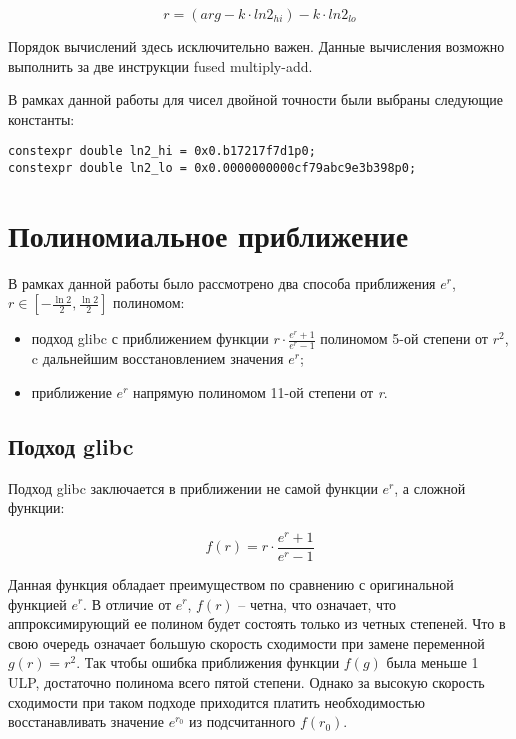\begin{equation}
    r = (arg - k \cdot ln{2}_{hi}) - k \cdot ln{2}_{lo}
\end{equation}

Порядок вычислений здесь исключительно важен.
Данные вычисления возможно выполнить за две инструкции \foreignlanguage{english}{fused multiply-add}.

В рамках данной работы для чисел двойной точности были выбраны следующие константы:

\begin{lstlisting}[caption={Константы $\ln{2}_{hi}$ и $\ln{2}_{lo}$}, captionpos=b, label={lst:ln2_hi_lo}]
constexpr double ln2_hi = 0x0.b17217f7d1p0;
constexpr double ln2_lo = 0x0.0000000000cf79abc9e3b398p0;
\end{lstlisting}

\section{Полиномиальное приближение}

В рамках данной работы было рассмотрено два способа приближения $e^r$, \newline $r \in [-\frac{\ln{2}}{2}, \frac{\ln{2}}{2}]$ полиномом:

\begin{itemize}
    \item подход glibc с приближением функции $r \cdot \frac{e^{r} + 1}{e^{r} - 1}$ полиномом 5-ой степени от $r^2$, c дальнейшим восстановлением значения $e^r$;
    \item приближение $e^r$ напрямую полиномом 11-ой степени от \textit{r}.
\end{itemize}

\subsection{Подход glibc}
\label{sec:work:exp:glibc}

Подход glibc заключается в приближении не самой функции $e^r$, а сложной функции:

\begin{equation}
    f(r) = r \cdot \frac{e^{r} + 1}{e^{r} - 1}
\end{equation}

Данная функция обладает преимуществом по сравнению с оригинальной функцией $e^r$.
В отличие от $e^r$, $f(r)$ -- четна, что означает, что аппроксимирующий ее полином будет состоять только из четных степеней.
Что в свою очередь означает большую скорость сходимости при замене переменной $g(r) = r^2$.
Так чтобы ошибка приближения функции $f(g)$ была меньше 1 ULP, достаточно полинома всего пятой степени.
Однако за высокую скорость сходимости при таком подходе приходится платить необходимостью восстанавливать значение $e^{r_0}$ из подсчитанного $f(r_0)$.

